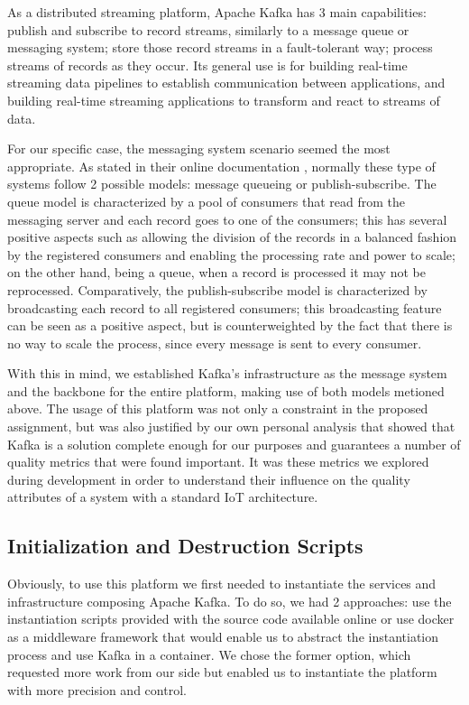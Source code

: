 \documentclass[12pt]{article}
\begin{document}
As a distributed streaming platform, Apache Kafka has 3 main capabilities: publish and subscribe to record streams, similarly to a message queue or 
messaging system; store those record streams in a fault-tolerant way; process streams of records as they occur. 
Its general use is for building real-time streaming data pipelines to establish communication between applications, and building real-time streaming applications 
to transform and react to streams of data.

For our specific case, the messaging system scenario seemed the most appropriate.
As stated in their online documentation \cite{kafka}, normally these type of systems follow 2 possible models: message queueing or publish-subscribe. 
The queue model is characterized by a pool of consumers that read from the messaging server and each record goes to one of the consumers; 
this has several positive aspects such as allowing the division of the records in a balanced fashion by the registered consumers and enabling the processing rate 
and power to scale; on the other hand, being a queue, when a record is processed it may not be reprocessed.
Comparatively, the publish-subscribe model is characterized by broadcasting each record to all registered consumers; this broadcasting feature can be seen as a 
positive aspect, but is counterweighted by the fact that there is no way to scale the process, since every message is sent to every consumer.

With this in mind, we established Kafka's infrastructure as the message system and the backbone for the entire platform, making use of both models metioned above.
The usage of this platform was not only a constraint in the proposed assignment, but was also justified by our own personal analysis that showed that Kafka is a 
solution complete enough for our purposes and guarantees a number of quality metrics that were found important.
It was these metrics we explored during development in order to understand their influence on the quality attributes of a system with a standard IoT architecture. 

\subsection{Initialization and Destruction Scripts} %

Obviously, to use this platform we first needed to instantiate the services and infrastructure composing Apache Kafka. 
To do so, we had 2 approaches: use the instantiation scripts provided with the source code available online \cite{kafka} or use docker as a middleware 
framework that would enable us to abstract the instantiation process and use Kafka in a container. 
We chose the former option, which requested more work from our side but enabled us to instantiate the platform with more precision and control.
\end{document}
